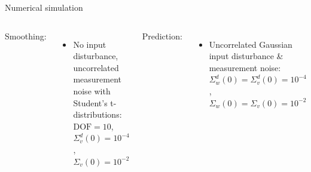 \documentclass[smaller,aspectratio=169]{beamer}        %
\begin{document}
\begin{frame}{Numerical simulation}
\begin{columns}
    \alert{Smoothing:}
    \begin{itemize}
        \item No input disturbance, uncorrelated measurement noise with Student’s t-distributions: $\text{DOF}=10$, $\Sigma_v^d(0)=10^{-4}$, $\Sigma_v(0)=10^{-2}$
    \end{itemize}

    \begin{table}[ht]
    \caption{Data-driven smoothing result comparison}
    \end{table}
    \alert{Prediction:}
    \begin{itemize}
        \item Uncorrelated Gaussian input disturbance \& measurement noise: $\Sigma_w^d(0)=\Sigma_v^d(0)=10^{-4}$, $\Sigma_w(0)=\Sigma_v(0)=10^{-2}$
    \end{itemize}

    \begin{table}[ht]
    \caption{Data-driven prediction result comparison}
    \end{table}
\end{columns}
\end{frame}
\end{document}
